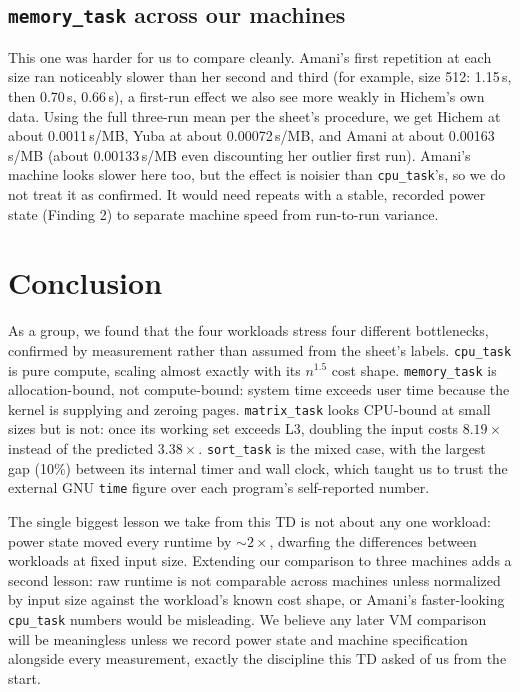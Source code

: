 \documentclass[11pt]{article}
\newcommand{\code}[1]{\texttt{#1}}
\begin{document}
\subsection{\code{memory\_task} across our machines}
This one was harder for us to compare cleanly. Amani's first repetition at each size ran
noticeably slower than her second and third (for example, size 512: 1.15\,s, then 0.70\,s,
0.66\,s), a first-run effect we also see more weakly in Hichem's own data. Using the full
three-run mean per the sheet's procedure, we get Hichem at about 0.0011\,s/MB, Yuba at about
0.00072\,s/MB, and Amani at about 0.00163\,s/MB (about 0.00133\,s/MB even discounting her outlier
first run). Amani's machine looks slower here too, but the effect is noisier than
\code{cpu\_task}'s, so we do not treat it as confirmed. It would need repeats with a stable,
recorded power state (Finding 2) to separate machine speed from run-to-run variance.

\section{Conclusion}
As a group, we found that the four workloads stress four different bottlenecks, confirmed by
measurement rather than assumed from the sheet's labels. \code{cpu\_task} is pure compute, scaling
almost exactly with its $n^{1.5}$ cost shape. \code{memory\_task} is allocation-bound, not
compute-bound: system time exceeds user time because the kernel is supplying and zeroing pages.
\code{matrix\_task} looks CPU-bound at small sizes but is not: once its working set exceeds L3,
doubling the input costs $8.19\times$ instead of the predicted $3.38\times$. \code{sort\_task} is
the mixed case, with the largest gap (10\%) between its internal timer and wall clock, which taught
us to trust the external GNU \code{time} figure over each program's self-reported number.

The single biggest lesson we take from this TD is not about any one workload: power state moved
every runtime by $\sim\!2\times$, dwarfing the differences between workloads at fixed input size.
Extending our comparison to three machines adds a second lesson: raw runtime is not comparable
across machines unless normalized by input size against the workload's known cost shape, or Amani's
faster-looking \code{cpu\_task} numbers would be misleading. We believe any later VM comparison will
be meaningless unless we record power state and machine specification alongside every measurement,
exactly the discipline this TD asked of us from the start.
\end{document}
